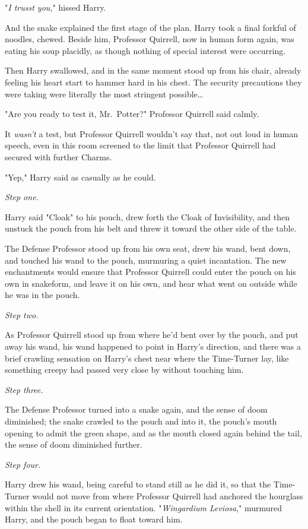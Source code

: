 "\emph{I trusst you,}" hissed Harry.

And the snake explained the first stage of the plan.
\sbreak
Harry took a final forkful of noodles, chewed. Beside him, Professor Quirrell, 
now in human form again, was eating his soup placidly, as though nothing of 
special interest were occurring.

Then Harry swallowed, and in the same moment stood up from his chair, already 
feeling his heart start to hammer hard in his chest. The security precautions 
they were taking were literally the most stringent possible{\ldots}

"Are you ready to test it, Mr.~Potter?" Professor Quirrell said calmly.

It \emph{wasn't} a test, but Professor Quirrell wouldn't say that, not out loud 
in human speech, even in this room screened to the limit that Professor 
Quirrell had secured with further Charms.

"Yep," Harry said as casually as he could.

\emph{Step one.}

Harry said "Cloak" to his pouch, drew forth the Cloak of Invisibility, and then 
unstuck the pouch from his belt and threw it toward the other side of the table.

The Defense Professor stood up from his own seat, drew his wand, bent down, and 
touched his wand to the pouch, murmuring a quiet incantation. The new 
enchantments would ensure that Professor Quirrell could enter the pouch on his 
own in snakeform, and leave it on his own, and hear what went on outside while 
he was in the pouch.

\emph{Step two.}

As Professor Quirrell stood up from where he'd bent over by the pouch, and put 
away his wand, his wand happened to point in Harry's direction, and there was a 
brief crawling sensation on Harry's chest near where the Time-Turner lay, like 
something creepy had passed very close by without touching him.

\emph{Step three.}

The Defense Professor turned into a snake again, and the sense of doom 
diminished; the snake crawled to the pouch and into it, the pouch's mouth 
opening to admit the green shape, and as the mouth closed again behind the 
tail, the sense of doom diminished further.

\emph{Step four.}

Harry drew his wand, being careful to stand still as he did it, so that the 
Time-Turner would not move from where Professor Quirrell had anchored the 
hourglass within the shell in its current orientation. "\emph{Wingardium 
Leviosa}," murmured Harry, and the pouch began to float toward him.

